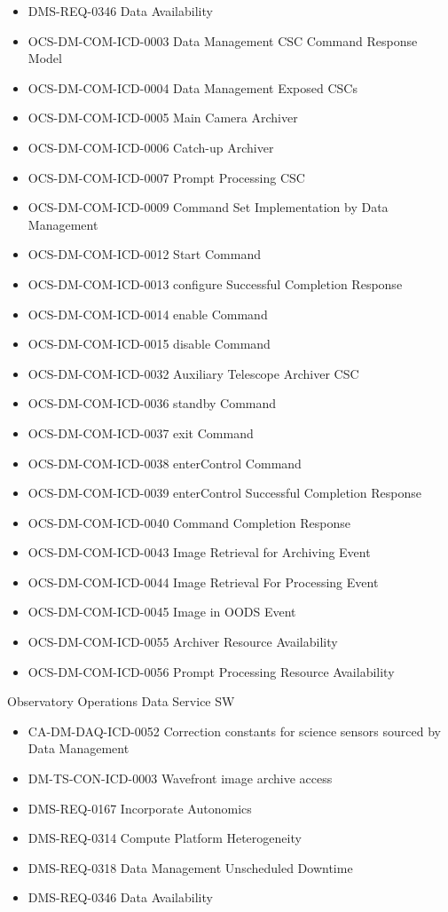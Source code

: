 \begin{itemize}
\item DMS-REQ-0346 Data Availability
\item OCS-DM-COM-ICD-0003 Data Management CSC Command Response Model
\item OCS-DM-COM-ICD-0004 Data Management Exposed CSCs
\item OCS-DM-COM-ICD-0005 Main Camera Archiver
\item OCS-DM-COM-ICD-0006 Catch-up Archiver
\item OCS-DM-COM-ICD-0007 Prompt Processing CSC
\item OCS-DM-COM-ICD-0009 Command Set Implementation by Data Management
\item OCS-DM-COM-ICD-0012 Start Command
\item OCS-DM-COM-ICD-0013 configure Successful Completion Response
\item OCS-DM-COM-ICD-0014 enable Command
\item OCS-DM-COM-ICD-0015 disable Command
\item OCS-DM-COM-ICD-0032 Auxiliary Telescope Archiver CSC
\item OCS-DM-COM-ICD-0036 standby Command
\item OCS-DM-COM-ICD-0037 exit Command
\item OCS-DM-COM-ICD-0038 enterControl Command
\item OCS-DM-COM-ICD-0039 enterControl Successful Completion Response
\item OCS-DM-COM-ICD-0040 Command Completion Response
\item OCS-DM-COM-ICD-0043 Image Retrieval for Archiving Event
\item OCS-DM-COM-ICD-0044 Image Retrieval For Processing Event
\item OCS-DM-COM-ICD-0045 Image in OODS Event
\item OCS-DM-COM-ICD-0055 Archiver Resource Availability
\item OCS-DM-COM-ICD-0056 Prompt Processing Resource Availability
\end{itemize}
Observatory Operations Data Service SW \begin{itemize}
\item CA-DM-DAQ-ICD-0052 Correction constants for science sensors sourced by Data Management
\item DM-TS-CON-ICD-0003 Wavefront image archive access
\item DMS-REQ-0167 Incorporate Autonomics
\item DMS-REQ-0314 Compute Platform Heterogeneity
\item DMS-REQ-0318 Data Management Unscheduled Downtime
\item DMS-REQ-0346 Data Availability
\end{itemize}
